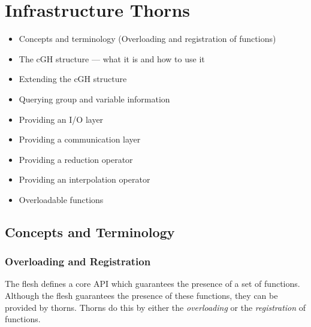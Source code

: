 
\renewcommand{\thepage}{\Alph{part}\arabic{page}}


\chapter{Infrastructure Thorns}
\label{chap:infrastructure}

\begin{itemize}
 \item{} Concepts and terminology (Overloading and registration of functions)
 \item{} The cGH structure --- what it is and how to use it
 \item{} Extending the cGH structure
 \item{} Querying group and variable information
 \item{} Providing an I/O layer
 \item{} Providing a communication layer
 \item{} Providing a reduction operator
 \item{} Providing an interpolation operator
 \item{} Overloadable functions
\end{itemize}

\section{Concepts and Terminology}
\label{chap:cote}

\subsection{Overloading and Registration}

The flesh defines a core API which guarantees the presence of a set of
functions.  Although the flesh guarantees the presence of these functions,
they can be provided by thorns.  Thorns do this by either the \textit{overloading}
or the \textit{registration} of functions.


